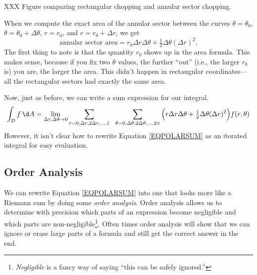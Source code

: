 XXX Figure comparing rectangular chopping and annular sector chopping.

When we compute the exact area of the annular sector between the curves
$\theta=\theta_0$, $\theta=\theta_0+\Delta\theta$, $r=r_0$, and $r=r_0+\Delta r$, 
we get 
\[
	\text{annular sector area} = r_0\Delta r\Delta \theta + \tfrac{1}{2}\Delta\theta(\Delta r)^2.
\]
The first thing to note is that the quantity $r_0$ shows up in the area formula.  
This makes sense, because if you fix two $\theta$ values, the further ``out'' (i.e., the larger
$r_0$ is) you are, the larger the area.  This didn't happen in rectangular coordinates---all the rectangular
sectors had exactly the same area.

Now, just as before, we can write a sum expression for our integral.
\begin{equation}
	\label{EQPOLARSUM}
	\int_{\mathcal D} f\,\d A =\lim_{\Delta r,\Delta \theta\to 0}
	\sum_{r=0,\Delta r,2\Delta r,\ldots,1}\ \ \sum_{\theta=0,\Delta\theta,
	2\Delta\theta, \ldots, 2\pi} \Big(
		r\Delta r\Delta \theta + \tfrac{1}{2}\Delta\theta(\Delta r)^2
	\Big)f(r,\theta)
\end{equation}
However, it isn't clear how to rewrite Equation \eqref{EQPOLARSUM} as an iterated integral
for easy evaluation.

\subsection{Order Analysis}
We can rewrite Equation \eqref{EQPOLARSUM} into one that looks more like a Riemann sum by
doing some \emph{order analysis}.  Order analysis allows us to determine
with precision
which parts of an expression become negligible and which parts are non-negligible\footnote{ \emph{Negligible}
is a fancy way of saying ``this can be safely ignored.''}.  Often
times order analysis will show that we can ignore or erase large parts of a formula and still
get the correct answer in the end.



